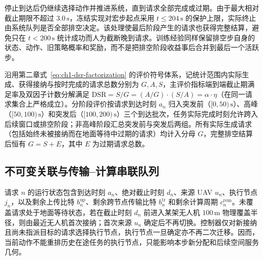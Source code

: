 停止到达后仍继续选择动作并推进系统，直到请求全部完成或过期。由于最大相对截止期限不超过 $3.0\,\mathrm{s}$，冻结实现对宏步起点采用 $t\leq204\,\mathrm{s}$ 的保护上限，实际终止由系统队列是否全部排空决定。该处理使最后阶段产生的请求也获得完整结算，避免只在 $t<200\,\mathrm{s}$ 统计成功而人为截断晚到请求。训练经验同样保留排空步自身的状态、动作、旧策略概率和奖励，而不是把排空阶段收益事后合并到最后一个活跃步。

沿用第二章式~\eqref{eq:ch1-dsr-factorization} 的评价符号体系，记统计范围内实际生成、获得接纳与按时完成的请求总数分别为 $G,A,S$，主评价指标端到端截止期满足率及双因子计数分解满足 $\mathrm{DSR}=S/G=(A/G)\cdot(S/A)=\alpha\cdot\eta$（在同一请求集合上严格成立）。分阶段评价按请求到达时刻 $a_n$ 归入突发前（$[0,50)\,\mathrm{s}$）、高峰（$[50,100)\,\mathrm{s}$）和突发后（$[100,200)\,\mathrm{s}$）三个到达批次，任务实际完成时刻允许跨入后续窗口或排空阶段；非高峰阶段汇总突发前与突发后两组。所有实际生成请求（包括始终未被接纳而在地面等待中过期的请求）均计入分母 $G$，完整排空结算后恒有 $G=S+E$，其中 $E$ 为过期请求总数。

\subsection{不可变关联与传输--计算串联队列}

请求 $n$ 的运行状态包含到达时刻 $a_n$、绝对截止时刻 $d_n$、来源 UAV $u_n$、执行节点 $j_n$，以及剩余上传比特 $b_n^{\mathrm{up}}$、剩余跨节点传输比特 $b_n^{\mathrm{tr}}$ 和剩余计算周期 $c_n^{\mathrm{rem}}$。未覆盖请求处于地面等待状态，若在截止时刻 $d_n$ 前进入某架无人机 $100\,\mathrm{m}$ 物理覆盖半径，则由最近无人机首次接纳；首次来源 $u_n$ 确定后不再切换。控制器仅对新接纳且尚未指派目标的请求选择执行节点，执行节点一旦确定亦不再二次迁移。因而，当前动作不能重排历史在途任务的执行节点，只能影响本步新分配和后续空间服务几何。

